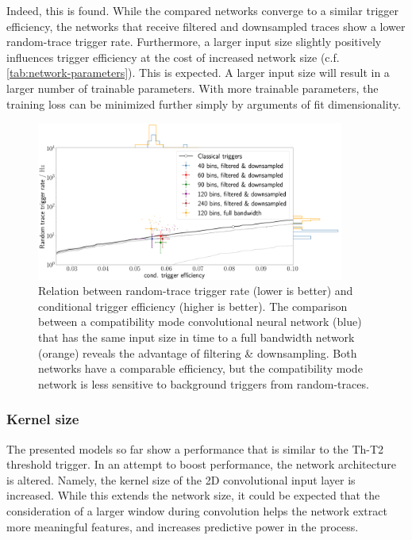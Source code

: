 Indeed, this is found. While the compared networks converge to a similar trigger efficiency, the networks that receive filtered and downsampled traces show a lower 
random-trace trigger rate. Furthermore, a larger input size slightly positively influences trigger efficiency at the cost of increased network size (c.f. 
\autoref{tab:network-parameters}). This is expected. A larger input size will result in a larger number of trainable parameters. With more trainable parameters, 
the training loss can be minimized further simply by arguments of fit dimensionality. 



\begin{figure}
	\centering
	\includegraphics[width=0.9\textwidth]{./plots/CNN_input_size.png}
	\caption{Relation between random-trace trigger rate (lower is better) and conditional trigger efficiency (higher is better). The comparison between a 
	compatibility mode convolutional neural network (blue) that has the same input size in time to a full bandwidth network (orange) reveals the advantage of 
	filtering \& downsampling. Both networks have a comparable efficiency, but the compatibility mode network is less sensitive	to background triggers from 
	random-traces.}
	\label{fig:CNN-input-size}
\end{figure}

\subsubsection{Kernel size}
\label{sssec:kernel-size}

The presented models so far show a performance that is similar to the Th-T2 threshold trigger. In an attempt to boost performance, the network architecture is 
altered. Namely, the kernel size of the 2D convolutional input layer is increased. While this extends the network size, it could be expected that the 
consideration of a larger window during convolution helps the network extract more meaningful features, and increases predictive power in the process.

